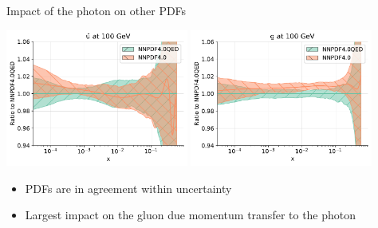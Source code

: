 \documentclass[aspectratio=169, 8pt,t]{beamer}
\begin{document}
\begin{frame}{Impact of the photon on other PDFs}
  \begin{center}
    \includegraphics[width=0.45\textwidth]{figures/nnpdf40_vs_qed_ubar.pdf}
    \includegraphics[width=0.45\textwidth]{figures/nnpdf40_vs_qed_g.pdf}
  \end{center}
  \begin{itemize}
    \item PDFs are in agreement within uncertainty
    \item Largest impact on the gluon due momentum transfer to the photon
  \end{itemize}
\end{frame}
\end{document}
